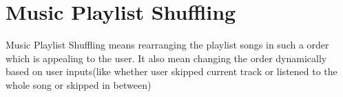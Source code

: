 \section{Music Playlist Shuffling} \label{sec1.1}
Music Playlist Shuffling means rearranging the playlist songs in such a order which is appealing to the user. It also mean changing the order dynamically based on user inputs(like whether user skipped current track or listened to the whole song or skipped in between)


